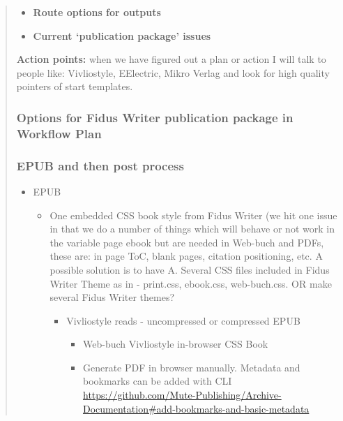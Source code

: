 \documentclass{article}
\begin{document}
\begin{quote}
\begin{itemize}
\item \textbf{Route options for outputs}


\item \textbf{Current ‘publication package’ issues}


\end{itemize}

\textbf{Action points: }when we have figured out a plan or action I will talk to people like: Vivliostyle, EElectric, Mikro Verlag and look for high quality pointers of start templates.




\subsubsection{\textbf{Options for Fidus Writer publication package in Workflow Plan}}\label{H9605788}



\subsubsection{\textbf{EPUB and then post process}}\label{H5047983}


\begin{itemize}
\item EPUB

\begin{itemize}
\item One embedded CSS book style from Fidus Writer (we hit one issue in that we do a number of things which will behave or not work in the variable page ebook but are needed in Web-buch and PDFs, these are: in page ToC, blank pages, citation positioning, etc. A possible solution is to have A. Several CSS files included in Fidus Writer Theme as in - print.css, ebook.css, web-buch.css. OR make several Fidus Writer themes?

\begin{itemize}
\item Vivliostyle reads - uncompressed or compressed EPUB

\begin{itemize}
\item Web-buch Vivliostyle in-browser CSS Book


\item Generate PDF in browser manually. Metadata and bookmarks can be added with CLI \href{https://github.com/Mute-Publishing/Archive-Documentation#add-bookmarks-and-basic-metadata}{https://github.com/Mute-Publishing/Archive-Documentation\#add-bookmarks-and-basic-metadata}


\end{itemize}
\end{itemize}
\end{itemize}
\end{itemize}
\end{quote}
\end{document}
